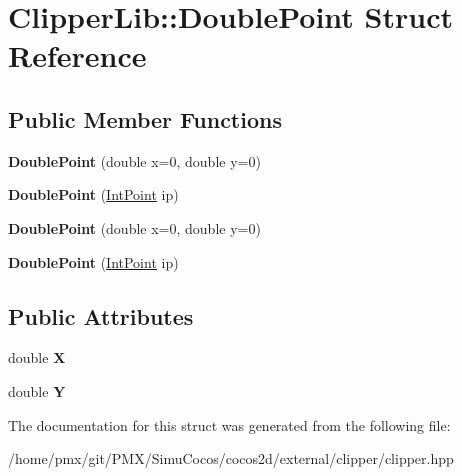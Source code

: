 \hypertarget{structClipperLib_1_1DoublePoint}{}\section{Clipper\+Lib\+:\+:Double\+Point Struct Reference}
\label{structClipperLib_1_1DoublePoint}
\subsection*{Public Member Functions}
\begin{DoxyCompactItemize}
\item 
\mbox{\label{structClipperLib_1_1DoublePoint_a3ccbea6aaf488e0a2d8ac499d2676093}} 
{\bfseries Double\+Point} (double x=0, double y=0)
\item 
\mbox{\label{structClipperLib_1_1DoublePoint_afd33c9193b3cf11536936dc933b965a4}} 
{\bfseries Double\+Point} (\hyperlink{structClipperLib_1_1IntPoint}{Int\+Point} ip)
\item 
\mbox{\label{structClipperLib_1_1DoublePoint_a3ccbea6aaf488e0a2d8ac499d2676093}} 
{\bfseries Double\+Point} (double x=0, double y=0)
\item 
\mbox{\label{structClipperLib_1_1DoublePoint_afd33c9193b3cf11536936dc933b965a4}} 
{\bfseries Double\+Point} (\hyperlink{structClipperLib_1_1IntPoint}{Int\+Point} ip)
\end{DoxyCompactItemize}
\subsection*{Public Attributes}
\begin{DoxyCompactItemize}
\item 
\mbox{\label{structClipperLib_1_1DoublePoint_a675837cc05f20447313789b82d84ad31}} 
double {\bfseries X}
\item 
\mbox{\label{structClipperLib_1_1DoublePoint_a49774a93540882d88448badf37034454}} 
double {\bfseries Y}
\end{DoxyCompactItemize}


The documentation for this struct was generated from the following file\+:\begin{DoxyCompactItemize}
\item 
/home/pmx/git/\+P\+M\+X/\+Simu\+Cocos/cocos2d/external/clipper/clipper.\+hpp\end{DoxyCompactItemize}
